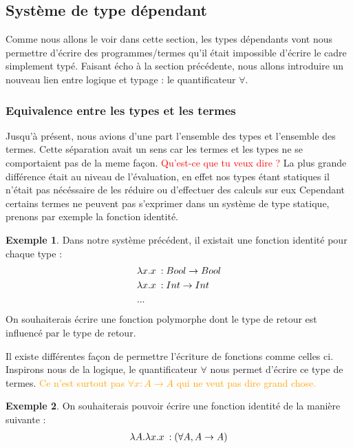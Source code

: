 \documentclass {article}
\theoremstyle{definition}
\newtheorem{example}{Exemple}
\theoremstyle{remark}
\newcommand{\todo}[1]{\textcolor{red}{#1}}
\newcommand{\attention}[1]{\textcolor{orange}{#1}}
\begin{document}
\subsection{Système de type dépendant}

Comme nous allons le voir dans cette section, les types dépendants vont nous permettre d'écrire des programmes/termes qu'il était impossible d'écrire le cadre simplement typé. Faisant écho à la section précédente,
nous allons introduire un nouveau lien entre logique et typage : le quantificateur $\forall$.

\subsubsection{Equivalence entre les types et les termes}
\label{presentation_type_dependants}

Jusqu'à présent, nous avions d'une part l'ensemble des types et l'ensemble des termes. Cette séparation 
avait un sens car les termes et les types ne se comportaient pas de la meme façon. \todo{Qu'est-ce que tu veux dire ?} La plus grande différence 
était au niveau de l'évaluation, en effet nos types étant statiques il n'était pas nécéssaire de les réduire
ou d'effectuer des calculs sur eux %
Cependant certains termes ne peuvent pas s'exprimer dans un système de type statique, prenons par exemple
la fonction identité. 
\begin{example}
  Dans notre système précédent, il existait une fonction identité pour chaque type :
  \begin{align*}
    &\lambda x. x\: :Bool\rightarrow Bool \\
    &\lambda x. x\: :Int\rightarrow Int \\
    & ... \\
  \end{align*}
On souhaiterais écrire une fonction polymorphe dont le type de retour est influencé par le type de retour.
\end{example}

Il existe différentes façon de permettre l'écriture de fonctions comme celles ci. Inspirons nous de la
logique, le quantificateur $\forall$ nous permet d'écrire ce type de termes.
\attention{Ce n'est surtout pas $\forall x : A \rightarrow A$ qui ne veut pas dire grand chose.}
\begin{example}
  On souhaiterais pouvoir écrire une fonction identité de la manière suivante :
  \begin{align*}
    \lambda A. \lambda x. x\::(\forall A, A \rightarrow A)
  \end{align*}
\end{example}
\end{document}
